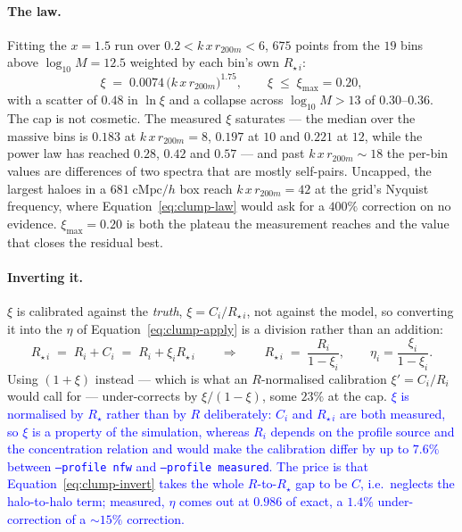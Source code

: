 \documentclass{article}
\begin{document}
\paragraph{The law.} Fitting the $x = 1.5$ run over $0.2 < k\,x\,r_{200m} < 6$,
$675$ points from the $19$ bins above $\log_{10}M = 12.5$ weighted by each
bin's own $R_{\star\,i}$:
\begin{equation}
  \xi \;=\; 0.0074\,\big(k\,x\,r_{200m}\big)^{1.75},
  \qquad \xi \;\le\; \xi_{\max} = 0.20 ,
  \label{eq:clump-law}
\end{equation}
with a scatter of $0.48$ in $\ln\xi$ and a collapse across $\log_{10}M > 13$ of
$0.30$--$0.36$. The cap is not cosmetic. The measured $\xi$ saturates --- the
median over the massive bins is $0.183$ at $k\,x\,r_{200m} = 8$, $0.197$ at
$10$ and $0.221$ at $12$, while the power law has reached $0.28$, $0.42$ and
$0.57$ --- and past $k\,x\,r_{200m}\sim18$ the per-bin values are differences
of two spectra that are mostly self-pairs. Uncapped, the largest haloes in a
$681\;\mathrm{cMpc}/h$ box reach $k\,x\,r_{200m} = 42$ at the grid's Nyquist
frequency, where Equation~\eqref{eq:clump-law} would ask for a $400\%$
correction on no evidence. $\xi_{\max} = 0.20$ is both the plateau the
measurement reaches and the value that closes the residual best.

\paragraph{Inverting it.} $\xi$ is calibrated against the \emph{truth},
$\xi = C_i/R_{\star\,i}$, not against the model, so converting it into the
$\eta$ of Equation~\eqref{eq:clump-apply} is a division rather than an addition:
\begin{equation}
  R_{\star\,i} \;=\; R_i + C_i \;=\; R_i + \xi_i R_{\star\,i}
  \qquad\Longrightarrow\qquad
  R_{\star\,i} \;=\; \frac{R_i}{1-\xi_i},
  \qquad \eta_i = \frac{\xi_i}{1-\xi_i} .
  \label{eq:clump-invert}
\end{equation}
Using $(1+\xi)$ instead --- which is what an $R$-normalised calibration
$\xi' = C_i/R_i$ would call for --- under-corrects by $\xi/(1-\xi)$, some
$23\%$ at the cap. \textcolor{blue}{$\xi$ is normalised by $R_\star$ rather than
by $R$ deliberately: $C_i$ and $R_{\star\,i}$ are both measured, so $\xi$ is a
property of the simulation, whereas $R_i$ depends on the profile source and the
concentration relation and would make the calibration differ by up to $7.6\%$
between \texttt{--profile nfw} and \texttt{--profile measured}. The price is
that Equation~\eqref{eq:clump-invert} takes the whole $R$-to-$R_\star$ gap to
be $C$, i.e.\ neglects the halo-to-halo term; measured, $\eta$ comes out at
$0.986$ of exact, a $1.4\%$ under-correction of a $\sim15\%$ correction.}
\end{document}
